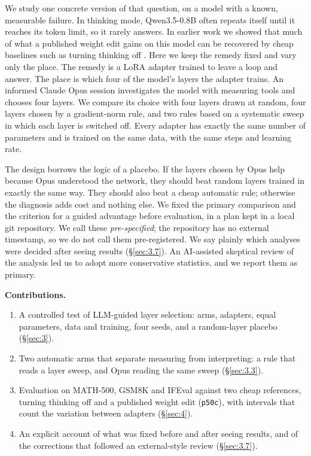 \documentclass[11pt]{article}
\begin{document}
We study one concrete version of that question, on a model with a known, measurable failure. In thinking mode, Qwen3.5-0.8B often repeats itself until it reaches its token limit, so it rarely answers. In earlier work we showed that much of what a published weight edit gains on this model can be recovered by cheap baselines such as turning thinking off \citep{giraldo2026}. Here we keep the remedy fixed and vary only the place. The remedy is a LoRA adapter \citep{hu2022} trained to leave a loop and answer. The place is which four of the model's \NModelLayers{} layers the adapter trains. An informed Claude Opus session investigates the model with measuring tools and chooses four layers. We compare its choice with four layers drawn at random, four layers chosen by a gradient-norm rule, and two rules based on a systematic sweep in which each layer is switched off. Every adapter has exactly the same number of parameters and is trained on the same data, with the same steps and learning rate.

The design borrows the logic of a placebo. If the layers chosen by Opus help because Opus understood the network, they should beat random layers trained in exactly the same way. They should also beat a cheap automatic rule; otherwise the diagnosis adds cost and nothing else. We fixed the primary comparison and the criterion for a guided advantage before evaluation, in a plan kept in a local git repository. We call these \emph{pre-specified}; the repository has no external timestamp, so we do not call them pre-registered. We say plainly which analyses were decided after seeing results (\S\ref{sec:3.7}). An AI-assisted skeptical review of the analysis led us to adopt more conservative statistics, and we report them as primary.

\textbf{Contributions.}

\begin{enumerate}[nosep,leftmargin=*]
\item A controlled test of LLM-guided layer selection: \NArms{} arms, \NLora{} adapters, equal parameters, data and training, four seeds, and a random-layer placebo (\S\ref{sec:3}).
\item Two automatic arms that separate measuring from interpreting: a rule that reads a layer sweep, and Opus reading the same sweep (\S\ref{sec:3.3}).
\item Evaluation on MATH-500, GSM8K and IFEval against two cheap references, turning thinking off and a published weight edit (\texttt{p50c}), with intervals that count the variation between adapters (\S\ref{sec:4}).
\item An explicit account of what was fixed before and after seeing results, and of the corrections that followed an external-style review (\S\ref{sec:3.7}).
\end{enumerate}
\end{document}
